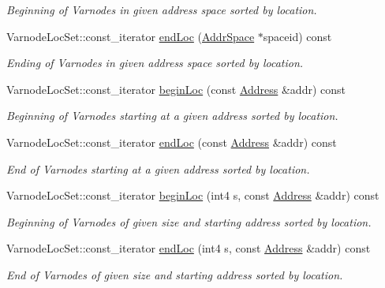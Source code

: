 \begin{DoxyCompactItemize}
\begin{DoxyCompactList}\small\item\em Beginning of Varnodes in given address space sorted by location. \end{DoxyCompactList}\item 
Varnode\+Loc\+Set\+::const\+\_\+iterator \mbox{\hyperlink{class_varnode_bank_abdbae6976cda0615c7bf24026bac0d67}{end\+Loc}} (\mbox{\hyperlink{class_addr_space}{Addr\+Space}} $\ast$spaceid) const
\begin{DoxyCompactList}\small\item\em Ending of Varnodes in given address space sorted by location. \end{DoxyCompactList}\item 
Varnode\+Loc\+Set\+::const\+\_\+iterator \mbox{\hyperlink{class_varnode_bank_a10c8010d9b6fc375f83cb6605487e5bf}{begin\+Loc}} (const \mbox{\hyperlink{class_address}{Address}} \&addr) const
\begin{DoxyCompactList}\small\item\em Beginning of Varnodes starting at a given address sorted by location. \end{DoxyCompactList}\item 
Varnode\+Loc\+Set\+::const\+\_\+iterator \mbox{\hyperlink{class_varnode_bank_ad4f1a373644dccfa63af8cdd56753afd}{end\+Loc}} (const \mbox{\hyperlink{class_address}{Address}} \&addr) const
\begin{DoxyCompactList}\small\item\em End of Varnodes starting at a given address sorted by location. \end{DoxyCompactList}\item 
Varnode\+Loc\+Set\+::const\+\_\+iterator \mbox{\hyperlink{class_varnode_bank_a136ff36679b30898f9284ad2eaea60e9}{begin\+Loc}} (int4 s, const \mbox{\hyperlink{class_address}{Address}} \&addr) const
\begin{DoxyCompactList}\small\item\em Beginning of Varnodes of given size and starting address sorted by location. \end{DoxyCompactList}\item 
Varnode\+Loc\+Set\+::const\+\_\+iterator \mbox{\hyperlink{class_varnode_bank_ac38dab2a950a91fffdc237b5427641f5}{end\+Loc}} (int4 s, const \mbox{\hyperlink{class_address}{Address}} \&addr) const
\begin{DoxyCompactList}\small\item\em End of Varnodes of given size and starting address sorted by location. \end{DoxyCompactList}\item 

\end{DoxyCompactItemize}
